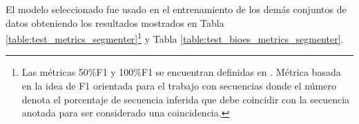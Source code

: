 \documentclass[a4paper,11pt,twocolumn,twoside]{article}
\begin{document}



El modelo seleccionado fue usado en el entrenamiento de los demás conjuntos de datos obteniendo los resultados mostrados
en Tabla \ref{table:test_metrics_segmenter}\footnote{Las métricas 50\%F1 y 100\%F1 se encuentran definidas en \cite{persing2016end}.
Métrica basada en la idea de F1 orientada para el trabajo con secuencias donde el número denota el porcentaje de secuencia inferida que debe coincidir con 
la secuencia anotada para ser considerado una coincidencia.} 
y Tabla \ref{table:test_bioes_metrics_segmenter}.
\end{document}
